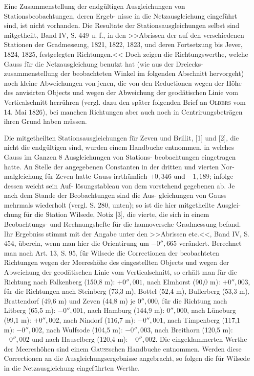\documentclass[12pt,a4paper]{article}
\theoremstyle{plain}
\theoremstyle{definition}
\theoremstyle{remark}
\begin{document}
Eine Zusammenstellung der endg\"ultigen Ausgleichungen von Stationsbeobachtungen, deren Ergeb-
nisse in die Netzausgleichung eingef\"uhrt sind, ist nicht vorhanden. Die Resultate der Stationsausgleichungen
selbst sind mitgetheilt, Band IV, S. 449 u. f., in den >>Abrissen der auf den verschiedenen Stationen der
Gradmessung, 1821, 1822, 1823, und deren Fortsetzung bis Jever, 1824, 1825, festgelegten Richtungen.<< Doch
zeigen die Richtungswerthe, welche Gauss f\"ur die Netzausgleichung benutzt hat (wie aus der Dreiecks-
zusammenstellung der beobachteten Winkel im folgenden Abschnitt hervorgeht) noch kleine Abweichungen
von jenen, die von den Reductionen wegen der H\"ohe des anvisirten Objects und wegen der Abweichung
der geod\"atischen Linie vom Verticalschnitt herr\"uhren (vergl. dazu den sp\"ater folgenden Brief an \textsc{Olbers} vom
14. Mai 1826), bei manchen Richtungen aber auch noch in Centrirungsbetr\"agen ihren Grund haben m\"ussen.

Die mitgetheilten Stationsausgleichungen f\"ur Zeven und Brillit, [1] und [2], die nicht die endg\"ultigen
sind, wurden einem Handbuche entnommen, in welches Gauss im Ganzen 8 Ausgleichungen von Stations-
beobachtungen eingetragen hatte. An Stelle der angegebenen Constanten in der dritten und vierten Nor-
malgleichung f\"ur Zeven hatte Gauss irrth\"umlich $+0{,}346$ und $-1{,}189$; infolge dessen weicht sein Auf-
l\"osungstableau von dem vorstehend gegebenen ab. Je nach dem Stande der Beobachtungen sind die Aus-
gleichungen von Gauss mehrmals wiederholt (vergl. S. 280, unten); so ist die hier mitgetheilte Ausglei-
chung f\"ur die Station Wilsede, Notiz [3], die vierte, die sich in einem Beobachtungs- und Rechnungshefte
f\"ur die hannoversche Gradmessung befand. Ihr Ergebniss stimmt mit der Angabe unter den >>Abrissen
etc.<<, Band IV, S. 454, \"uberein, wenn man hier die Orientirung um $-0''{,}665$ ver\"andert. Berechnet man
nach Art. 13, S. 95, f\"ur Wilsede die Correctionen der beobachteten Richtungen wegen der Meeresh\"ohe des
eingestellten Objects und wegen der Abweichung der geod\"atischen Linie vom Verticalschnitt, so erh\"alt man
f\"ur die Richtung nach Falkenberg (150,8 m): $+0''{,}001$, nach Elmhorst (90,0 m): $+0''{,}003$, f\"ur die Richtungen
nach Steinberg (73,3 m), Bottel (52,4 m), Bullerberg (53,3 m), Brattendorf (49,6 m) und Zeven (44,8 m) je $0''{,}000$,
f\"ur die Richtung nach Litberg (65,5 m): $-0''{,}001$, nach Hamburg (144,9 m): $0''{,}000$, nach L\"uneburg (99,1 m):
$+0''{,}002$, nach Nindorf (116,7 m): $-0''{,}001$, nach Timpenberg (117,1 m): $-0''{,}002$, nach Wulfsode (104,5 m):
$-0''{,}003$, nach Breithorn (120,5 m): $-0''{,}002$ und nach Hauselberg (120,4 m): $-0''{,}002$. Die eingeklammerten
Werthe der Meeresh\"ohen sind einem \textsc{Gauss}schen Handbuche entnommen. Werden diese Correctionen an
die Ausgleichungsergebnisse angebracht, so folgen die f\"ur Wilsede in die Netzausgleichung eingef\"uhrten
Werthe.
\end{document}

